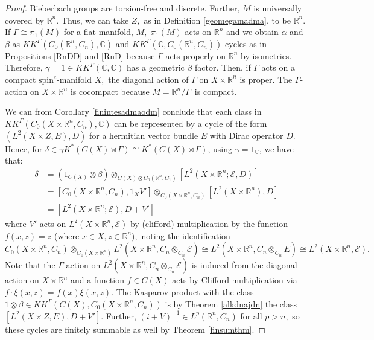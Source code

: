 \documentclass[a4paper,reqno]{amsart}
\numberwithin{equation}{section}
\def\C{\mathbb{C}}
\def\R{\mathbb{R}}
\theoremstyle{definition}
\theoremstyle{remark}
\begin{document}
\begin{proof}
Bieberbach groups are torsion-free and discrete. Further, $M$ is universally covered by $\R^n.$ Thus, we can take $Z,$ as in Definition \ref{geomegamadma}, to be $\R^n.$ If $\Gamma \cong \pi_1(M)$ for a flat manifold, $M,$ $\pi_1(M)$ acts on $\R^n$ and we obtain $\alpha$ and $\beta$ as $KK^\Gamma(C_0(\R^n, C_n), \C)$ and $KK^\Gamma(\C, C_0(\R^n, C_n))$ cycles as in Propositions \ref{RnDD} and \ref{RnD} because $\Gamma$ acts properly on $\R^n$ by isometries. Therefore, $\gamma =1 \in KK^{\Gamma}(\C,\C)$ has a geometric $\beta$ factor. Then, if $\Gamma$ acts on a compact $\text{spin}^c$-manifold $X,$ the diagonal action of $\Gamma$ on $X \times \R^n$ is proper. The $\Gamma$-action on $X \times \R^n$ is cocompact because $M=\R^n/\Gamma$ is compact. 

We can from Corollary \ref{finintesadmaodm} conclude that each class in $KK^\Gamma(C_0(X \times \R^n, C_n), \C)$ can be represented by a cycle of the form $(L^2(X \times Z, E), D)$ for a hermitian vector bundle $E$ with Dirac operator $D.$ 
 Hence, for $\delta\in \gamma K^*(C(X) \rtimes \Gamma) \cong K^*(C(X) \rtimes \Gamma)$, using $\gamma =1_\mathbb{C}$, we have that: 
 \begin{align*}
    \delta &= (1_{C(X)} \otimes \beta) \otimes_{C(X) \otimes C_0(\R^n,C_1)} [L^2(X\times \R^n; \mathcal{E},D)] \\ &= [C_0(X\times \R^n, C_n), 1_{X} V'] \otimes_{C_0(X\times \R^n, C_n)} [L^2(X \times \R^n), D] \\ &= [L^2(X\times \R^n; \mathcal{E}), D + V']
\end{align*} 
where $V'$ acts on $L^2(X \times \R^n, \mathcal{E})$ by (clifford) multiplication by the function $f(x,z) = z$ (where $x \in X, z \in \R^n),$ noting the identification 
\[C_0(X \times \R^n, C_n) \otimes_{C_0(X \times \R^n)} L^2(X \times \R^n, C_n \otimes_{C_n} \mathcal{E}) \cong L^2(X\times \R^n, C_n \otimes_{C_n} E) \cong L^2(X \times \R^n, \mathcal{E}).\] 
Note that the $\Gamma$-action on $L^2(X \times \R^n, C_n \otimes_{C_n} \mathcal{E})$ is induced from the diagonal action on $X \times \R^n$ and a function $f \in C(X)$ acts by Clifford multiplication via $f\cdot \xi (x,z) = f(x)\xi(x,z)$. The Kasparov product with the class $1 \otimes \beta \in KK^\Gamma(C(X),C_0(X \times \R^n, C_n))$ is by Theorem \ref{alkdnajdn} the class $[L^2(X \times Z,E), D+V' ]$. Further, $(i+V)^{-1} \in L^p(\R^n,C_n)$ for all $p > n,$ so these cycles are finitely summable as well by Theorem \ref{finsumthm}.
\end{proof}
\end{document}
